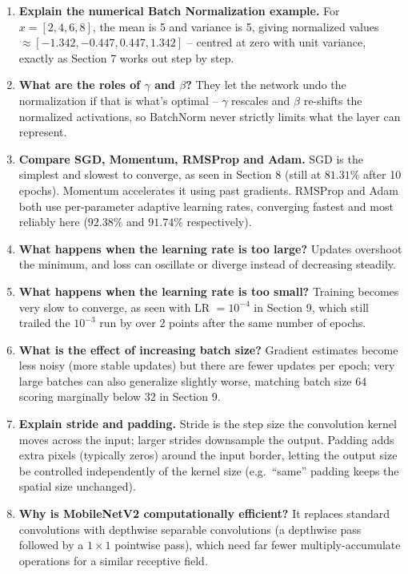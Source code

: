 \documentclass[10pt]{article}
\begin{document}
\begin{enumerate}
\item \textbf{Explain the numerical Batch Normalization example.}
For $x=[2,4,6,8]$, the mean is 5 and variance is 5, giving normalized
values $\approx[-1.342,-0.447,0.447,1.342]$ -- centred at zero with unit
variance, exactly as Section 7 works out step by step.

\item \textbf{What are the roles of $\gamma$ and $\beta$?}
They let the network undo the normalization if that is what's optimal
-- $\gamma$ rescales and $\beta$ re-shifts the normalized activations,
so BatchNorm never strictly limits what the layer can represent.

\item \textbf{Compare SGD, Momentum, RMSProp and Adam.}
SGD is the simplest and slowest to converge, as seen in Section 8
(still at $81.31\%$ after 10 epochs). Momentum accelerates it using
past gradients. RMSProp and Adam both use per-parameter adaptive
learning rates, converging fastest and most reliably here
($92.38\%$ and $91.74\%$ respectively).

\item \textbf{What happens when the learning rate is too large?}
Updates overshoot the minimum, and loss can oscillate or diverge
instead of decreasing steadily.

\item \textbf{What happens when the learning rate is too small?}
Training becomes very slow to converge, as seen with LR $=10^{-4}$ in
Section 9, which still trailed the $10^{-3}$ run by over 2 points
after the same number of epochs.

\item \textbf{What is the effect of increasing batch size?}
Gradient estimates become less noisy (more stable updates) but there
are fewer updates per epoch; very large batches can also generalize
slightly worse, matching batch size 64 scoring marginally below 32 in
Section 9.

\item \textbf{Explain stride and padding.}
Stride is the step size the convolution kernel moves across the input;
larger strides downsample the output. Padding adds extra pixels
(typically zeros) around the input border, letting the output size be
controlled independently of the kernel size (e.g.\ ``same'' padding
keeps the spatial size unchanged).

\item \textbf{Why is MobileNetV2 computationally efficient?}
It replaces standard convolutions with depthwise separable
convolutions (a depthwise pass followed by a $1\times1$ pointwise
pass), which need far fewer multiply-accumulate operations for a
similar receptive field.


\end{enumerate}
\end{document}
